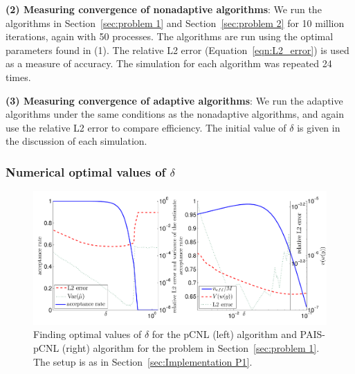 \documentclass[final]{siamltex}
\begin{document}
{\bf (2) Measuring convergence of nonadaptive algorithms}: We run the algorithms in Section~\ref{sec:problem 1} and Section~\ref{sec:problem 2} for 10 million iterations, again with 50 processes. The algorithms are run using the optimal parameters found in (1). The relative L2 error (Equation~\ref{eqn:L2_error}) is used as a measure of accuracy. The simulation for each algorithm was repeated 24 times.

{\bf (3) Measuring convergence of adaptive algorithms}: We run the adaptive algorithms under the same conditions as the nonadaptive algorithms, and again use the relative L2 error to compare efficiency. The initial value of $\delta$ is given in the discussion of each simulation.

\subsubsection{Numerical optimal values of $\delta$}\label{sec:Optimal values P1}

\begin{figure}[h]
\begin{center}
\includegraphics[width=\textwidth]{"figures/pCNL1 opt delta"}
\caption{Finding optimal values of $\delta$ for the pCNL (left) algorithm and PAIS-pCNL (right) algorithm for the problem in Section~\ref{sec:problem 1}. The setup is as in Section~\ref{sec:Implementation P1}.}
\label{fig:P1 opt delta}
\end{center}
\end{figure}
\end{document}
